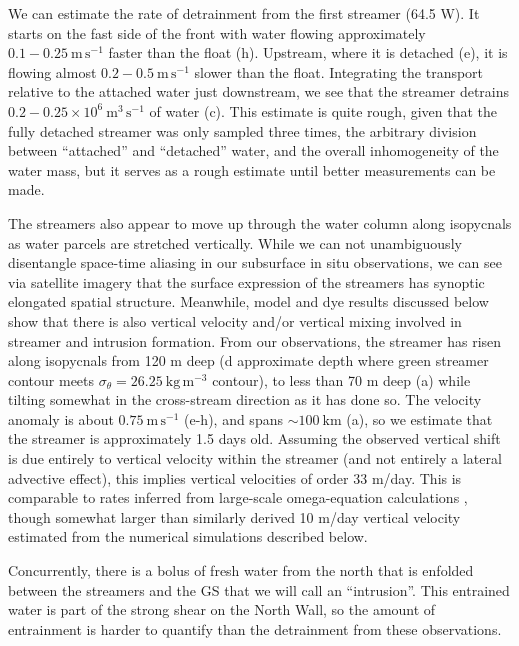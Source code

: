 \documentclass[draft,grl]{agutex2015}
\begin{document}
\begin{article}
We can estimate the rate of detrainment from the first streamer (64.5 W). It starts on the fast side of the front with water flowing approximately $0.1-0.25\ \mathrm{m\,s^{-1}}$ faster than the float (h). Upstream, where it is detached (e), it is flowing almost $0.2-0.5\ \mathrm{m\,s^{-1}}$ slower than the float.  Integrating the transport relative to the attached water just downstream, we see that the streamer detrains $0.2-0.25 \times 10^6\ \mathrm{m^3\,s^{-1}}$ of water (c).  This estimate is quite rough, given that the fully detached streamer was only sampled three times, the arbitrary division between ``attached'' and ``detached'' water, and the overall inhomogeneity of the water mass, but it serves as a rough estimate until better measurements can be made.  

The streamers also appear to move up through the water column along isopycnals as water parcels are stretched vertically.  While we can not unambiguously disentangle space-time aliasing in our subsurface in situ observations, we can see via satellite imagery that the surface expression of the streamers has synoptic elongated spatial structure.  Meanwhile, model and dye results discussed below show that there is also vertical velocity and/or vertical mixing involved in streamer and intrusion formation.  From our observations, the streamer has risen along isopycnals from 120 m deep (d approximate depth where green streamer contour meets $\sigma_{\theta} = 26.25\ \mathrm{kg\,m^{-3}}$ contour), to less than 70 m deep (a) while tilting somewhat in the cross-stream direction as it has done so.  The velocity anomaly is about $0.75\ \mathrm{m\,s^{-1}}$ (e-h), and spans $\sim 100\ \mathrm{km}$ (a), so we estimate that the streamer is approximately 1.5 days old.  Assuming the observed vertical shift is due entirely to vertical velocity within the streamer (and not entirely a lateral advective effect), this implies vertical velocities of order 33 m/day.  This is comparable to rates inferred from large-scale omega-equation calculations  \citep{thomasjoyce10}, though  somewhat larger than similarly derived 10 m/day vertical velocity estimated from the numerical simulations described below.

Concurrently, there is a bolus of fresh water from the north that is enfolded between the streamers and the GS that we will call an ``intrusion''. This entrained water is part of the strong shear on the North Wall, so the amount of entrainment is harder to quantify than the detrainment from these observations.


\end{article}
\end{document}
